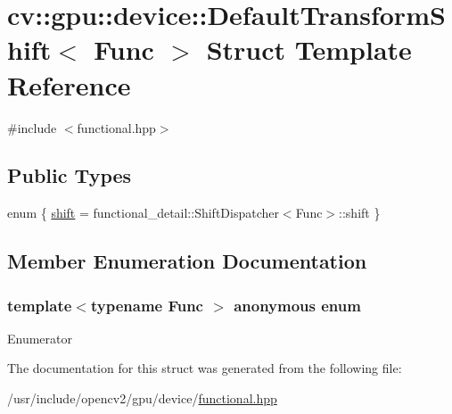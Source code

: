 \hypertarget{structcv_1_1gpu_1_1device_1_1DefaultTransformShift}{\section{cv\-:\-:gpu\-:\-:device\-:\-:Default\-Transform\-Shift$<$ Func $>$ Struct Template Reference}
\label{structcv_1_1gpu_1_1device_1_1DefaultTransformShift}
}


{\ttfamily \#include $<$functional.\-hpp$>$}

\subsection*{Public Types}
\begin{DoxyCompactItemize}
\item 
enum \{ \hyperlink{structcv_1_1gpu_1_1device_1_1DefaultTransformShift_aa8043ad030fa00b9a142979ac128b4e4aa09cadb88c444b8992ee24fb32fb6242}{shift} = functional\-\_\-detail\-:\-:Shift\-Dispatcher$<$Func$>$\-:\-:shift
 \}
\end{DoxyCompactItemize}


\subsection{Member Enumeration Documentation}
\hypertarget{structcv_1_1gpu_1_1device_1_1DefaultTransformShift_aa8043ad030fa00b9a142979ac128b4e4}{\subsubsection[{anonymous enum}]{\setlength{\rightskip}{0pt plus 5cm}template$<$typename Func $>$ anonymous enum}}\label{structcv_1_1gpu_1_1device_1_1DefaultTransformShift_aa8043ad030fa00b9a142979ac128b4e4}
\begin{Desc}
\item[Enumerator]\par
\begin{description}
\item[{\em 
\hypertarget{structcv_1_1gpu_1_1device_1_1DefaultTransformShift_aa8043ad030fa00b9a142979ac128b4e4aa09cadb88c444b8992ee24fb32fb6242}{shift}\label{structcv_1_1gpu_1_1device_1_1DefaultTransformShift_aa8043ad030fa00b9a142979ac128b4e4aa09cadb88c444b8992ee24fb32fb6242}
}]\end{description}
\end{Desc}


The documentation for this struct was generated from the following file\-:\begin{DoxyCompactItemize}
\item 
/usr/include/opencv2/gpu/device/\hyperlink{functional_8hpp}{functional.\-hpp}\end{DoxyCompactItemize}
